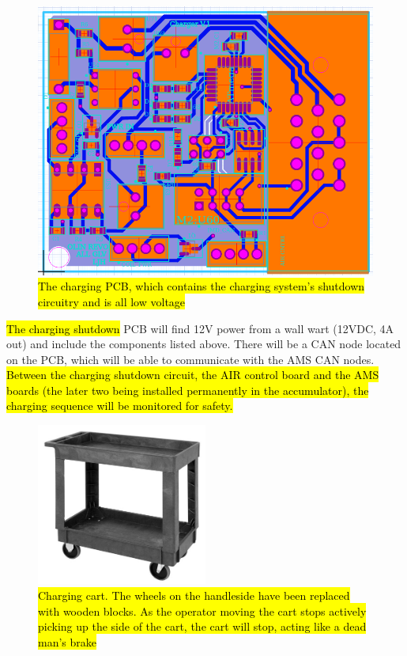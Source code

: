 \documentclass{article}
\DeclareRobustCommand{\hlr}[1]{{\sethlcolor{red}\hl{#1}}}
\begin{document}
            \begin{figure}[H]
                \centering
                \includegraphics[width = 0.7 \textwidth]{chargerPCB}
                \caption{\hlr{The charging PCB, which contains the charging system's shutdown circuitry and is all low voltage}}
                \label{chargeschem}
            \end{figure}

            \hlr{The charging shutdown }PCB will find 12V power from a wall wart (12VDC, 4A out) and include the components listed above. There will be a CAN node located on the PCB, which will be able to communicate with the AMS CAN nodes. \hlr{Between the charging shutdown circuit, the AIR control board and the AMS boards (the later two being installed permanently in the accumulator), the charging sequence will be monitored for safety.}

            \begin{figure}[H]
                \centering
                \includegraphics[width = 0.5\textwidth]{Cart}
                \caption{\hlr{Charging cart. The wheels on the handleside have been replaced with wooden blocks. As the operator moving the cart stops actively picking up the side of the cart, the cart will stop, acting like a dead man's brake}}
                \label{cart}
            \end{figure}
\end{document}
